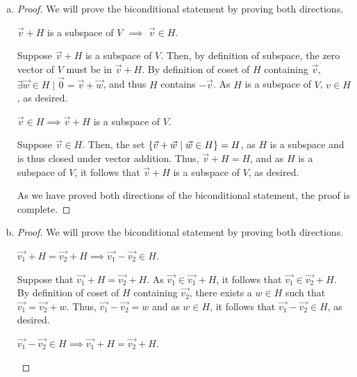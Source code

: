\documentclass[11pt]{scrartcl}
\theoremstyle{dotlessP}
\theoremstyle{dotlessN}
\DeclarePairedDelimiter\set{\{}{\}}
\begin{document}
\begin{enumerate}[(a)]
	\item 
	\begin{proof}
		We will prove the biconditional statement by proving both directions.
		\begin{claim*}
			$\vec{v} + H$ is a subspace of $V$ $\implies$ $\vec{v} \in H$.
		\end{claim*}
		\begin{subproof}
			[Subproof]
			Suppose $\vec{v} + H$ is a subspace of $V$. Then, by definition of subspace, the zero vector of $V$ must be in $\vec{v} + H$. By definition of coset of $H$ containing $\vec{v}$, $\exists \vec{w} \in H \mid \vec{0} = \vec{v} + \vec{w}$, and thus $H$ contains $-\vec{v}$. As $H$ is a subspace of $V$, $v \in H$, as desired.
		\end{subproof}
		\begin{claim*}
			$\vec{v} \in H \implies \vec{v} + H$ is a subspace of $V$.
		\end{claim*}
		\begin{subproof}
			[Subproof]
			Suppose $\vec{v} \in H$. Then, the set $\set*{\vec{v} + \vec{w} \mid \vec{w} \in H} = H$, as $H$ is a subspace and is thus closed under vector addition. Thus, $\vec{v} + H = H$, and as $H$ is a subspace of $V$, it follows that $\vec{v} + H$ is a subspace of $V$, as desired.
		\end{subproof}
		As we have proved both directions of the biconditional statement, the proof is complete.
	\end{proof}
\item 
\begin{proof}
	We will prove the biconditional statement by proving both directions.
	\begin{claim*}
		$\vec{v_1} + H = \vec{v_2} + H \implies \vec{v_1} - \vec{v_2} \in H$.
	\end{claim*}
	\begin{subproof}
		[Subproof]
		Suppose that $\vec{v_1} + H = \vec{v_2} + H$. As $\vec{v_1} \in \vec{v_1} + H$, it follows that $\vec{v_1} \in \vec{v_2} + H$. By definition of coset of $H$ containing $\vec{v_2}$, there exists a $w \in H$ such that $\vec{v_1} = \vec{v_2} + w$. Thus, $\vec{v_1} - \vec{v_2} = w$ and as $w \in H$, it follows that $\vec{v_1} - \vec{v_2} \in H$, as desired.
	\end{subproof}
	\begin{claim*}
		$\vec{v_1} - \vec{v_2} \in H \implies \vec{v_1} + H = \vec{v_2} + H$.
	\end{claim*}

\end{proof}
\end{enumerate}
\end{document}
